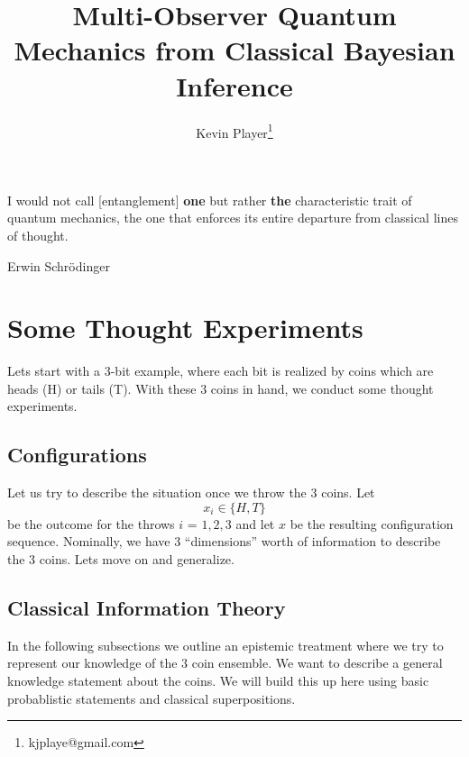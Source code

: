 \documentclass[12pt,a4paper]{article}
\begin{document}
\title{Multi-Observer Quantum Mechanics from Classical Bayesian Inference}
\author[1]{Kevin Player\footnote{kjplaye@gmail.com}}

\maketitle


\epigraph{I would not call [entanglement] {\bf one} but rather {\bf the} characteristic trait of quantum mechanics, the one that enforces its entire departure from classical lines of thought.}{Erwin Schrödinger}


\section{Some Thought Experiments}
Lets start with a 3-bit example, where each bit is realized by coins which are heads (H) or tails (T).  With these 3 coins in hand, we conduct some thought experiments.
\subsection{Configurations}
Let us try to describe the situation once we throw the 3 coins.  Let
\[
x_i \in \{H,T\}
\]
be the outcome for the throws $i$ = $1,2,3$ and let $x$ be the resulting configuration sequence.  Nominally, we have 3 ``dimensions'' worth of information to describe the 3 coins.  Lets move on and generalize.
  
\subsection{Classical Information Theory}
In the following subsections we outline an epistemic treatment where we try to represent our knowledge of the 3 coin ensemble. We want to describe a general knowledge statement about the coins.  We will build this up here using basic probablistic statements and classical superpositions.
\end{document}
